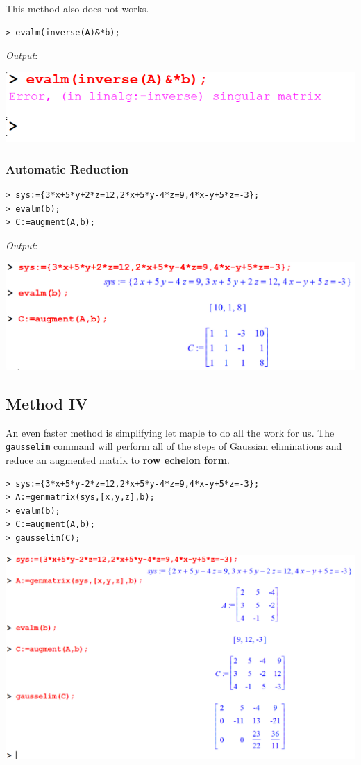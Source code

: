 \documentclass[
]{book}
\theoremstyle{definition}
\theoremstyle{definition}
\theoremstyle{definition}
\theoremstyle{definition}
\theoremstyle{remark}
\begin{document}
This method also does not works.

\begin{verbatim}
> evalm(inverse(A)&*b);
\end{verbatim}

\emph{Output}:

\includegraphics{figures/Lessson 5/fig13.png}

\subsubsection{Automatic Reduction}\label{automatic-reduction}

\begin{verbatim}
> sys:={3*x+5*y+2*z=12,2*x+5*y-4*z=9,4*x-y+5*z=-3};
> evalm(b);
> C:=augment(A,b);
\end{verbatim}

\emph{Output}:

\includegraphics{figures/Lessson 5/fig14.png}

\subsection{Method IV}\label{method-iv}

An even faster method is simplifying let maple to do all the work for us. The \texttt{gausselim} command will perform all of the steps of Gaussian eliminations and reduce an augmented matrix to \textbf{row echelon form}.

\begin{verbatim}
> sys:={3*x+5*y-2*z=12,2*x+5*y-4*z=9,4*x-y+5*z=-3};
> A:=genmatrix(sys,[x,y,z],b);
> evalm(b);
> C:=augment(A,b);
> gausselim(C);
\end{verbatim}

\includegraphics{figures/Lessson 5/fig15.png}
\end{document}
